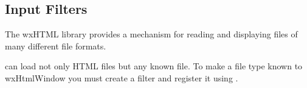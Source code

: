 \subsection{Input Filters}\label{filters}

The wxHTML library provides a mechanism for reading and displaying
files of many different file formats. 

 can load not
only HTML files but any known file. To make a file type known to wxHtmlWindow
you must create a  filter and
register it using .

